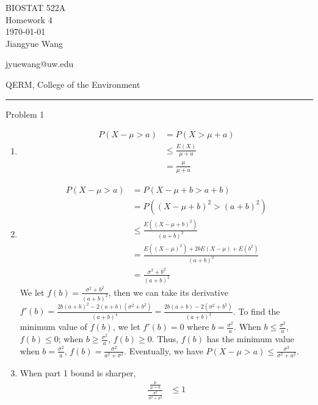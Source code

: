 \documentclass[12pt,letterpaper, onecolumn]{exam}
\begin{document}
\begingroup  
    \centering
    \LARGE BIOSTAT 522A\\
    \LARGE Homework 4\\[0.5em]
    \large \today\\[0.5em]
    \large Jiangyue Wang\par
    \large jyuewang@uw.edu\par
    \large QERM, College of the Environment\par
\endgroup
\rule{\textwidth}{0.4pt}
\pointsdroppedatright   %
\printanswers
\renewcommand{\solutiontitle}{\noindent\textbf{Ans:}\enspace}   %

\begin{questions}

    \question Problem 1
    \begin{solution}
    \begin{enumerate}
        \item \begin{align*}
            P(X-\mu>a) & = P(X>\mu+a) \\
            & \leq \frac{E(X)}{\mu+a} \\
            & = \frac{\mu}{\mu+a}
        \end{align*}
        \item \begin{align*}
            P(X-\mu>a) & = P(X-\mu+b>a+b) \\
            & = P((X-\mu+b)^2>(a+b)^2) \\
            & \leq \frac{E((X-\mu+b)^2)}{(a+b)^2} \\
            & = \frac{E((X-\mu)^2)+2bE(X-\mu)+E(b^2)}{(a+b)^2}\\
            & = \frac{\sigma^2+b^2}{(a+b)^2}
        \end{align*}
        We let $f(b) = \frac{\sigma^2+b^2}{(a+b)^2}$, then we can take its derivative $f'(b) = \frac{2b(a+b)^2-2(a+b)(\sigma^2+b^2)}{(a+b)^4} = \frac{2b(a+b)-2(\sigma^2+b^2)}{(a+b)^3}$. To find the minimum value of $f(b)$, we let $f'(b) = 0$ where $b = \frac{\sigma^2}{a}$. When $b \leq \frac{\sigma^2}{a}$, $f(b) \leq 0$; when  $b \geq \frac{\sigma^2}{a}$, $f(b) \geq 0$. Thus, $f(b)$ has the minimum value when $b = \frac{\sigma^2}{a}$, $f(b) = \frac{\sigma^2}{a^2+\sigma^2}$.  Eventually, we have $P(X-\mu>a) \leq \frac{\sigma^2}{\sigma^2+a^2}$. 
        \item When part 1 bound is sharper, \begin{align*}
            \frac{\frac{\mu}{\mu+a}}{\frac{\sigma^2}{\sigma^2+a^2}} & \leq 1 \\

\end{align*}
\end{enumerate}
\end{solution}
\end{questions}
\end{document}
